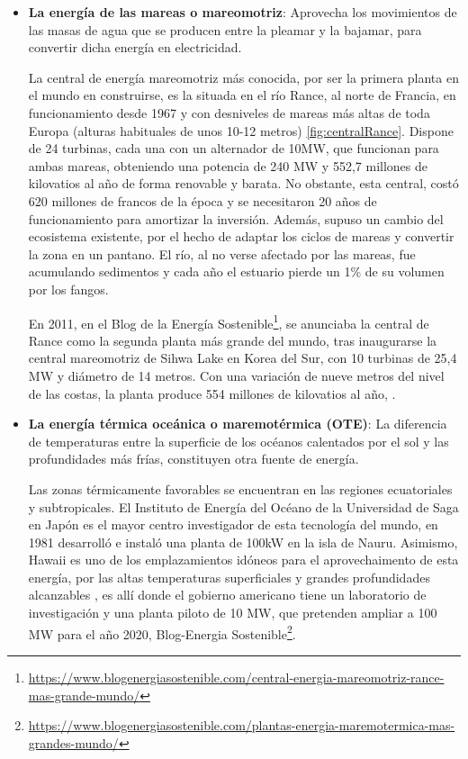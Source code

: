 \begin{itemize}
\item
  \textbf{La energía de las mareas o mareomotriz}: Aprovecha los
  movimientos de las masas de agua que se producen entre la pleamar y la
  bajamar, para convertir dicha energía en electricidad.

  La central de energía mareomotriz más conocida, por ser la primera
  planta en el mundo en construirse, es la situada en el río Rance, al
  norte de Francia, en funcionamiento desde 1967 y con desniveles de
  mareas más altas de toda Europa (alturas habituales de unos 10-12
  metros) \autoref{fig:centralRance}. Dispone de 24 turbinas, cada una con un alternador de 10MW,
  que funcionan para ambas mareas, obteniendo una potencia de 240 MW y
  552,7 millones de kilovatios al año de forma renovable y barata. No
  obstante, esta central, costó 620 millones de francos de la época y se
  necesitaron 20 años de funcionamiento para amortizar la inversión.
  Además, supuso un cambio del ecosistema existente, por el hecho de
  adaptar los ciclos de mareas y convertir la zona en un pantano. El
  río, al no verse afectado por las mareas, fue acumulando sedimentos y
  cada año el estuario pierde un 1\% de su volumen por los fangos.


  En 2011, en el Blog de la Energía Sostenible\footnote{\url{https://www.blogenergiasostenible.com/central-energia-mareomotriz-rance-mas-grande-mundo/}}, se anunciaba la
  central de Rance como la segunda planta más grande del mundo,
  tras inaugurarse la central mareomotriz de Sihwa Lake en Korea del
  Sur, con 10 turbinas de 25,4 MW y diámetro de 14 metros. Con una
  variación de nueve metros del nivel de las costas, la planta produce 554
  millones de kilovatios al año, \cite{kbs}.
\item
  \textbf{La energía térmica oceánica o maremotérmica (OTE)}: La
  diferencia de temperaturas entre la superficie de los océanos
  calentados por el sol y las profundidades más frías, constituyen otra
  fuente de energía.

  Las zonas térmicamente favorables se encuentran en las regiones
  ecuatoriales y subtropicales. El Instituto de Energía del Océano de la
  Universidad de Saga en Japón es el mayor centro investigador de esta
  tecnología del mundo, en 1981 desarrolló e instaló una planta de 100kW
  en la isla de Nauru. Asimismo, Hawaii es uno de los emplazamientos
  idóneos para el aprovechaimento de esta energía, por las altas
  temperaturas superficiales y grandes profundidades alcanzables , es
  allí donde el gobierno americano tiene un laboratorio de investigación
  y una planta piloto de 10 MW, que pretenden ampliar a 100 MW para el
  año 2020, Blog-Energia Sostenible\footnote{\url{https://www.blogenergiasostenible.com/plantas-energia-maremotermica-mas-grandes-mundo/}}.
  

\end{itemize}
